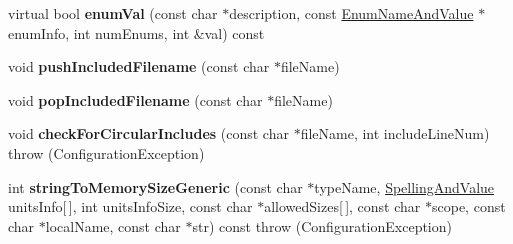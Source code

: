 \begin{DoxyCompactItemize}
\item 
\hypertarget{classCONFIG4CPP__NAMESPACE_1_1ConfigurationImpl_abeddd726b29d8d5b957578615782107c}{virtual bool {\bfseries enum\-Val} (const char $\ast$description, const \hyperlink{structCONFIG4CPP__NAMESPACE_1_1EnumNameAndValue}{Enum\-Name\-And\-Value} $\ast$enum\-Info, int num\-Enums, int \&val) const }\label{classCONFIG4CPP__NAMESPACE_1_1ConfigurationImpl_abeddd726b29d8d5b957578615782107c}

\item 
\hypertarget{classCONFIG4CPP__NAMESPACE_1_1ConfigurationImpl_acd18d90446f70d85b77de4f23e1d68f8}{void {\bfseries push\-Included\-Filename} (const char $\ast$file\-Name)}\label{classCONFIG4CPP__NAMESPACE_1_1ConfigurationImpl_acd18d90446f70d85b77de4f23e1d68f8}

\item 
\hypertarget{classCONFIG4CPP__NAMESPACE_1_1ConfigurationImpl_a765066f329118935c25ef7d58a912922}{void {\bfseries pop\-Included\-Filename} (const char $\ast$file\-Name)}\label{classCONFIG4CPP__NAMESPACE_1_1ConfigurationImpl_a765066f329118935c25ef7d58a912922}

\item 
\hypertarget{classCONFIG4CPP__NAMESPACE_1_1ConfigurationImpl_a7873fbd093d0b3a22f7ae2fc3f6ddead}{void {\bfseries check\-For\-Circular\-Includes} (const char $\ast$file\-Name, int include\-Line\-Num)  throw (\-Configuration\-Exception)}\label{classCONFIG4CPP__NAMESPACE_1_1ConfigurationImpl_a7873fbd093d0b3a22f7ae2fc3f6ddead}

\item 
\hypertarget{classCONFIG4CPP__NAMESPACE_1_1ConfigurationImpl_a3670c33b7e9a07f583aeb5b515c4725a}{int {\bfseries string\-To\-Memory\-Size\-Generic} (const char $\ast$type\-Name, \hyperlink{structCONFIG4CPP__NAMESPACE_1_1SpellingAndValue}{Spelling\-And\-Value} units\-Info\mbox{[}$\,$\mbox{]}, int units\-Info\-Size, const char $\ast$allowed\-Sizes\mbox{[}$\,$\mbox{]}, const char $\ast$scope, const char $\ast$local\-Name, const char $\ast$str) const   throw (\-Configuration\-Exception)}\label{classCONFIG4CPP__NAMESPACE_1_1ConfigurationImpl_a3670c33b7e9a07f583aeb5b515c4725a}

\end{DoxyCompactItemize}
